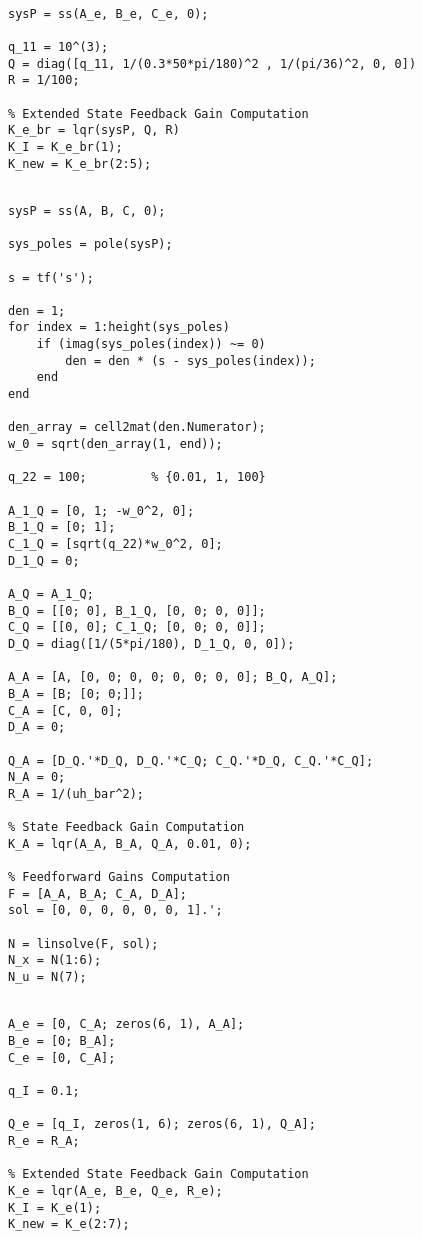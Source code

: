 \begin{lstlisting}[caption={Robust tracking with LQR obtained using the Bryson's rule.}, label={lst:lqr-br-robust}]
%% Robust tracking with LQR obtained using the Bryson's rule

sysP = ss(A_e, B_e, C_e, 0);

q_11 = 10^(3);
Q = diag([q_11, 1/(0.3*50*pi/180)^2 , 1/(pi/36)^2, 0, 0])
R = 1/100;

% Extended State Feedback Gain Computation
K_e_br = lqr(sysP, Q, R)
K_I = K_e_br(1);
K_new = K_e_br(2:5);
\end{lstlisting}
\begin{lstlisting}[caption={Frequency Shaped LQR for Nominal Tracking.}, label={lst:fs-resonant-freq}]
%% Frequency Shaped LQR for Nominal Tracking

sysP = ss(A, B, C, 0);

sys_poles = pole(sysP);

s = tf('s');

den = 1;
for index = 1:height(sys_poles)
    if (imag(sys_poles(index)) ~= 0)
        den = den * (s - sys_poles(index));
    end
end

den_array = cell2mat(den.Numerator);
w_0 = sqrt(den_array(1, end));

q_22 = 100;         % {0.01, 1, 100}

A_1_Q = [0, 1; -w_0^2, 0];
B_1_Q = [0; 1];
C_1_Q = [sqrt(q_22)*w_0^2, 0];
D_1_Q = 0;

A_Q = A_1_Q;
B_Q = [[0; 0], B_1_Q, [0, 0; 0, 0]];
C_Q = [[0, 0]; C_1_Q; [0, 0; 0, 0]];
D_Q = diag([1/(5*pi/180), D_1_Q, 0, 0]);

A_A = [A, [0, 0; 0, 0; 0, 0; 0, 0]; B_Q, A_Q];
B_A = [B; [0; 0;]];
C_A = [C, 0, 0];
D_A = 0;

Q_A = [D_Q.'*D_Q, D_Q.'*C_Q; C_Q.'*D_Q, C_Q.'*C_Q];
N_A = 0;
R_A = 1/(uh_bar^2);

% State Feedback Gain Computation
K_A = lqr(A_A, B_A, Q_A, 0.01, 0);

% Feedforward Gains Computation
F = [A_A, B_A; C_A, D_A];
sol = [0, 0, 0, 0, 0, 0, 1].';

N = linsolve(F, sol);
N_x = N(1:6);
N_u = N(7);
\end{lstlisting}

\begin{lstlisting}[caption={Frequency Shaped LQR with Integral Action.}, label={lst:fs-resonant-freq-robust}]
%% Frequency Shaped LQR with Integral Action

A_e = [0, C_A; zeros(6, 1), A_A];
B_e = [0; B_A];
C_e = [0, C_A];

q_I = 0.1;

Q_e = [q_I, zeros(1, 6); zeros(6, 1), Q_A];
R_e = R_A;

% Extended State Feedback Gain Computation
K_e = lqr(A_e, B_e, Q_e, R_e);
K_I = K_e(1);
K_new = K_e(2:7);
\end{lstlisting}